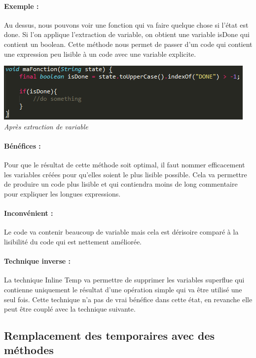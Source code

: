 \documentclass[a4paper,twoside,12pt,openright]{report}
\begin{document}
\paragraph{Exemple :}
Au dessus, nous pouvons voir une fonction qui va faire quelque chose si l'état est done.
Si l'on applique l'extraction de variable, on obtient une variable isDone qui contient un boolean. Cette méthode nous permet de passer d'un code qui contient une expression peu lisible à un code avec une variable explicite.

\begin{center}
\includegraphics[scale=1]{Image/Extraction_Variable2.png}\\
\itshape{Après extraction de variable}
\end{center}

\paragraph{Bénéfices :}
Pour que le résultat de cette méthode soit optimal, il faut nommer efficacement les variables créées pour  qu'elles soient le plus lisible possible. Cela va permettre de produire un code plus lisible et qui contiendra moins de long commentaire pour expliquer les longues expressions.

\paragraph{Inconvénient :}
Le code va contenir beaucoup de variable mais cela est dérisoire comparé à la lisibilité du code qui est nettement améliorée.

\paragraph{Technique inverse :}
La technique Inline Temp va permettre de supprimer les variables superflue qui contienne uniquement le résultat d'une opération simple qui va être utilisé une seul fois. Cette technique n'a pas de vrai bénéfice dans cette état, en revanche elle peut être couplé avec la technique suivante.\\

\subsection{Remplacement des temporaires avec des méthodes}
\end{document}
